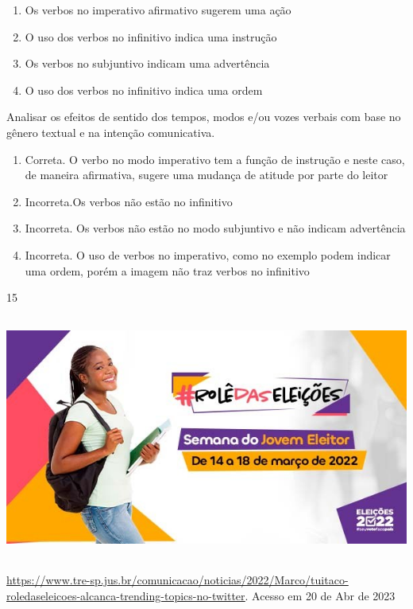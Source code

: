{{\begin{escolha}
{\begin{itemize}
\begin{itemize}
\begin{enumerate}
\def\labelenumi{\alph{enumi})}
\item
  Os verbos no imperativo afirmativo sugerem uma ação
\item
  O uso dos verbos no infinitivo indica uma instrução
\item
  Os verbos no subjuntivo indicam uma advertência
\item
  O uso dos verbos no infinitivo indica uma ordem
\end{enumerate}

Analisar os efeitos de sentido dos tempos, modos e/ou vozes verbais com
base no gênero textual e na intenção comunicativa.

\begin{enumerate}
\def\labelenumi{\arabic{enumi}.}
\item
  Correta. O verbo no modo imperativo tem a função de instrução e neste
  caso, de maneira afirmativa, sugere uma mudança de atitude por parte
  do leitor
\item
  Incorreta.Os verbos não estão no infinitivo
\item
  Incorreta. Os verbos não estão no modo subjuntivo e não indicam
  advertência
\item
  Incorreta. O uso de verbos no imperativo, como no exemplo podem
  indicar uma ordem, porém a imagem não traz verbos no infinitivo
\end{enumerate}

\num{15}

\includegraphics[width=5.90551in,height=3.15278in]{./imgSAEB_7_POR/media/image20.png}

\href{https://www.tre-sp.jus.br/comunicacao/noticias/2022/Marco/tuitaco-roledaseleicoes-alcanca-trending-topics-no-twitter}{\uline{https://www.tre-sp.jus.br/comunicacao/noticias/2022/Marco/tuitaco-roledaseleicoes-alcanca-trending-topics-no-twitter}}.
Acesso em 20 de Abr de 2023


\end{itemize}
\end{itemize}}
\end{escolha}}}

